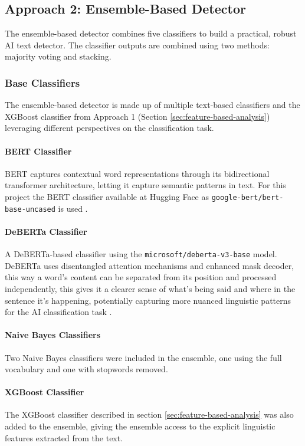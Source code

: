 \documentclass[11pt]{article}
\begin{document}
\subsection{Approach 2: Ensemble-Based Detector}
\label{sec:ensemble-based-detector}
The ensemble-based detector combines five classifiers to build a practical, robust AI text detector. The classifier outputs are combined using two methods: majority voting and stacking.

\subsubsection{Base Classifiers}
\label{sec:base-classifiers}

The ensemble-based detector is made up of multiple text-based classifiers and the XGBoost classifier from Approach 1 (Section \ref{sec:feature-based-analysis}) leveraging different perspectives on the classification task. 

\paragraph{BERT Classifier}
BERT captures contextual word representations through its bidirectional transformer architecture, letting it capture semantic patterns in text.
For this project the BERT classifier available at Hugging Face as \texttt{google-bert/bert-base-uncased} is used \citep{devlin2019bertpretrainingdeepbidirectional}.

\paragraph{DeBERTa Classifier}
A DeBERTa-based classifier using the \texttt{microsoft/deberta-v3-base} model. DeBERTa uses disentangled attention mechanisms and enhanced mask decoder, this way a word's content can be separated from its position and processed independently, this gives it a clearer sense of what's being said and where in the sentence it's happening, potentially capturing more nuanced linguistic patterns for the AI classification task \citep{he2023debertav3improvingdebertausing}.


\paragraph{Naive Bayes Classifiers}
Two Naive Bayes classifiers were included in the ensemble, one using the full vocabulary and one with stopwords removed.

\paragraph{XGBoost Classifier}
The XGBoost classifier described in section \ref{sec:feature-based-analysis} was also added to the ensemble, giving the ensemble access to the explicit linguistic features extracted from the text.
\end{document}

